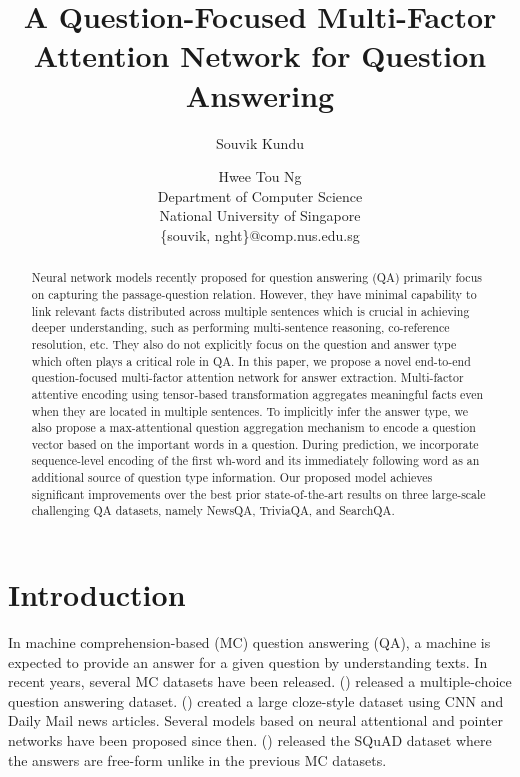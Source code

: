 \documentclass[letterpaper]{article}
\begin{document}
\title{A Question-Focused Multi-Factor Attention Network for Question Answering}

\author{Souvik Kundu \and Hwee Tou Ng\\
Department of Computer Science\\
National University of Singapore\\
\{souvik, nght\}@comp.nus.edu.sg\\
}

\maketitle
\begin{abstract}

Neural network models recently proposed for question answering (QA) primarily focus on capturing the passage-question relation. However, they have minimal capability to link relevant facts distributed across multiple sentences which is crucial in achieving deeper understanding, such as performing multi-sentence reasoning, co-reference resolution, etc. They also do not explicitly focus on the question and answer type which often plays a critical role in QA. In this paper, we propose a novel end-to-end question-focused multi-factor attention network for answer extraction. Multi-factor attentive encoding using tensor-based transformation aggregates meaningful facts even when they are located in multiple sentences. To implicitly infer the answer type, we also propose a max-attentional question aggregation mechanism to encode a question vector based on the important words in a question. During prediction, we incorporate sequence-level encoding of the first wh-word and its immediately following word as an additional source of question type information. Our proposed model achieves significant improvements over the best prior state-of-the-art results on three large-scale challenging QA datasets, namely NewsQA, TriviaQA, and SearchQA.

\end{abstract}
\section{Introduction}
\label{sec:intro}
In machine comprehension-based (MC) question answering (QA), a machine is expected to provide an answer for a given question by understanding texts.
In recent years, several MC datasets have been released.
\citeauthor{MCTestdata} (\citeyear{MCTestdata}) released a multiple-choice question answering dataset.
\citeauthor{HermannKGEKSB15} (\citeyear{HermannKGEKSB15}) created a large cloze-style dataset using CNN and Daily Mail news articles. Several models \cite{HermannKGEKSB15,chen2016thorough,KadlecSBK16,Kobayashi2016,attn_over_attn,GAR} based on neural attentional and pointer networks \cite{pointer_net} have been proposed since then.
\citeauthor{RajpurkarZLL16} (\citeyear{RajpurkarZLL16}) released the SQuAD dataset where the answers are free-form unlike in the previous MC datasets.
\end{document}
